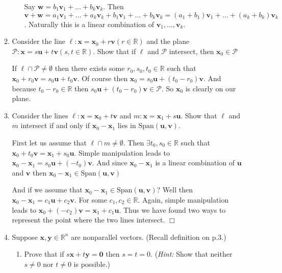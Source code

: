 \documentclass[letterpaper]{article}
\begin{document}
\begin{enumerate}
\begin{enumerate}
\begin{enumerate}
    Say $\mathbf{w}=b_1\mathbf{v}_1+\dots+b_k\mathbf{v}_k$. Then $\mathbf{v}+\mathbf{w}=a_1\mathbf{v}_1+\dots+a_k\mathbf{v}_k+b_1\mathbf{v}_1+\dots+b_k\mathbf{v}_k=(a_1+b_1)\mathbf{v}_1+\dots+(a_k+b_k)\mathbf{v}_k$. Naturally this is a linear combination of $\mathbf{v}_1,\dots,\mathbf{v}_k$.
    \end{enumerate}
  \item
  Consider the line $\ell: \mathbf{x}=\mathbf{x}_0+r\mathbf{v} (r\in \mathbb{R})$ and the plane $\mathcal{P}: \mathbf{x}=s\mathbf{u}+t\mathbf{v} (s,t\in \mathbb{R})$. Show that if $\ell$ and $\mathcal{P}$ intersect, then $\mathbf{x}_0\in \mathcal{P}$

  If $\ell\cap\mathcal{P}\ne \emptyset$ then there exists some $r_0,s_0,t_0\in \mathbb{R}$ such that $\mathbf{x}_0+r_0\mathbf{v}=s_0\mathbf{u}+t_0\mathbf{v}$. Of course then $\mathbf{x}_0=s_0\mathbf{u}+(t_0-r_0)\mathbf{v}$. And because $t_0-r_0\in \mathbb{R}$ then $s_0\mathbf{u}+(t_0-r_0)\mathbf{v}\in \mathcal{P}$. So $\mathbf{x}_0$ is clearly on our plane.
  \item
  Consider the lines $\ell: \mathbf{x}=\mathbf{x}_0+t\mathbf{v}$ and $\mathit{m}: \mathbf{x}=\mathbf{x}_1+s\mathbf{u}$. Show that $\ell$ and $\mathit{m}$ intersect if and only if $\mathbf{x}_0-\mathbf{x}_1$ lies in $\text{Span}(\mathbf{u},\mathbf{v})$.

  First let us assume that $\ell\cap \mathit{m}\ne \emptyset$. Then $\exists t_0,s_0\in \mathbb{R}$ such that $\mathbf{x}_0+t_0\mathbf{v}=\mathbf{x}_1+s_0\mathbf{u}$. Simple manipulation leads to $\mathbf{x}_0-\mathbf{x}_1=s_0\mathbf{u}+(-t_0)\mathbf{v}$. And since $\mathbf{x}_0-\mathbf{x}_1$ is a linear combination of $\mathbf{u}$ and $\mathbf{v}$ then $\mathbf{x}_0-\mathbf{x}_1\in \text{Span}(\mathbf{u},\mathbf{v})$

  And if we assume that $\mathbf{x}_0-\mathbf{x}_1\in \text{Span}(\mathbf{u},\mathbf{v})$? Well then $\mathbf{x}_0-\mathbf{x}_1=c_1\mathbf{u}+c_2\mathbf{v}$. For some $c_1,c_2\in \mathbb{R}$. Again, simple manipulation leads to $\mathbf{x}_0+(-c_2)\mathbf{v}=\mathbf{x}_1+c_1\mathbf{u}$. Thus we have found two ways to represent the point where the two lines intersect. $\Box$
  \item
  Suppose $\mathbf{x},\mathbf{y}\in \mathbb{R}^n$ are nonparallel vectors. (Recall definition on p.3.)

    \begin{enumerate}
    \item
    Prove that if $s\mathbf{x}+t\mathbf{y}=\mathbf{0}$ then $s=t=0$. ({\it Hint:} Show that neither $s\ne 0$ nor $t\ne 0$ is possible.)


\end{enumerate}
\end{enumerate}
\end{enumerate}
\end{document}
